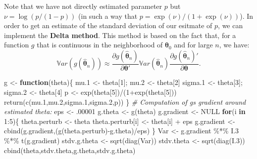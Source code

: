 \documentclass[
  12pt,
]{book}
\newenvironment{Shaded}{\begin{snugshade}}{\end{snugshade}}
\newcommand{\CommentTok}[1]{\textcolor[rgb]{0.56,0.35,0.01}{\textit{#1}}}
\newcommand{\ConstantTok}[1]{\textcolor[rgb]{0.00,0.00,0.00}{#1}}
\newcommand{\ControlFlowTok}[1]{\textcolor[rgb]{0.13,0.29,0.53}{\textbf{#1}}}
\newcommand{\DecValTok}[1]{\textcolor[rgb]{0.00,0.00,0.81}{#1}}
\newcommand{\FloatTok}[1]{\textcolor[rgb]{0.00,0.00,0.81}{#1}}
\newcommand{\FunctionTok}[1]{\textcolor[rgb]{0.00,0.00,0.00}{#1}}
\newcommand{\NormalTok}[1]{#1}
\newcommand{\OtherTok}[1]{\textcolor[rgb]{0.56,0.35,0.01}{#1}}
\newcommand{\SpecialCharTok}[1]{\textcolor[rgb]{0.00,0.00,0.00}{#1}}
\theoremstyle{definition}
\theoremstyle{definition}
\theoremstyle{definition}
\theoremstyle{definition}
\theoremstyle{remark}
\begin{document}
Note that we have not directly estimated parameter \(p\) but \(\nu = \log(p/(1-p))\) (in such a way that \(p = \exp(\nu)/(1+\exp(\nu))\)). In order to get an estimate of the standard deviation of our esitmate of \(p\), we can implement the \textbf{Delta method}. This method is based on the fact that, for a function \(g\) that is continuous in the neighborhood of \(\boldsymbol\theta_0\) and for large \(n\), we have:
\begin{equation}
\mathbb{V}ar(g(\hat{\boldsymbol\theta}_n)) \approx \frac{\partial g(\hat{\boldsymbol\theta}_n)}{\partial \boldsymbol\theta'}\mathbb{V}ar(\hat{\boldsymbol\theta}_n)\frac{\partial g(\hat{\boldsymbol\theta}_n)'}{\partial \boldsymbol\theta}.\label{eq:DeltaMethod}
\end{equation}

\begin{Shaded}
\begin{Highlighting}[]
\NormalTok{g }\OtherTok{\textless{}{-}} \ControlFlowTok{function}\NormalTok{(theta)\{}
\NormalTok{  mu}\FloatTok{.1} \OtherTok{\textless{}{-}}\NormalTok{ theta[}\DecValTok{1}\NormalTok{]; mu}\FloatTok{.2} \OtherTok{\textless{}{-}}\NormalTok{ theta[}\DecValTok{2}\NormalTok{]}
\NormalTok{  sigma}\FloatTok{.1} \OtherTok{\textless{}{-}}\NormalTok{ theta[}\DecValTok{3}\NormalTok{]; sigma}\FloatTok{.2} \OtherTok{\textless{}{-}}\NormalTok{ theta[}\DecValTok{4}\NormalTok{]}
\NormalTok{  p }\OtherTok{\textless{}{-}} \FunctionTok{exp}\NormalTok{(theta[}\DecValTok{5}\NormalTok{])}\SpecialCharTok{/}\NormalTok{(}\DecValTok{1}\SpecialCharTok{+}\FunctionTok{exp}\NormalTok{(theta[}\DecValTok{5}\NormalTok{]))}
  \FunctionTok{return}\NormalTok{(}\FunctionTok{c}\NormalTok{(mu}\FloatTok{.1}\NormalTok{,mu}\FloatTok{.2}\NormalTok{,sigma}\FloatTok{.1}\NormalTok{,sigma}\FloatTok{.2}\NormalTok{,p))}
\NormalTok{\}}
\CommentTok{\# Computation of g\textquotesingle{}s gradient around estimated theta:}
\NormalTok{eps }\OtherTok{\textless{}{-}}\NormalTok{ .}\DecValTok{00001}
\NormalTok{g.theta }\OtherTok{\textless{}{-}} \FunctionTok{g}\NormalTok{(theta)}
\NormalTok{g.gradient }\OtherTok{\textless{}{-}} \ConstantTok{NULL}
\ControlFlowTok{for}\NormalTok{(i }\ControlFlowTok{in} \DecValTok{1}\SpecialCharTok{:}\DecValTok{5}\NormalTok{)\{}
\NormalTok{  theta.perturb }\OtherTok{\textless{}{-}}\NormalTok{ theta}
\NormalTok{  theta.perturb[i] }\OtherTok{\textless{}{-}}\NormalTok{ theta[i] }\SpecialCharTok{+}\NormalTok{ eps}
\NormalTok{  g.gradient }\OtherTok{\textless{}{-}} \FunctionTok{cbind}\NormalTok{(g.gradient,(}\FunctionTok{g}\NormalTok{(theta.perturb)}\SpecialCharTok{{-}}\NormalTok{g.theta)}\SpecialCharTok{/}\NormalTok{eps)}
\NormalTok{\}}
\NormalTok{Var }\OtherTok{\textless{}{-}}\NormalTok{ g.gradient }\SpecialCharTok{\%*\%}\NormalTok{ I}\FloatTok{.3} \SpecialCharTok{\%*\%} \FunctionTok{t}\NormalTok{(g.gradient)}
\NormalTok{stdv.g.theta }\OtherTok{\textless{}{-}} \FunctionTok{sqrt}\NormalTok{(}\FunctionTok{diag}\NormalTok{(Var))}
\NormalTok{stdv.theta }\OtherTok{\textless{}{-}} \FunctionTok{sqrt}\NormalTok{(}\FunctionTok{diag}\NormalTok{(I}\FloatTok{.3}\NormalTok{))}
\FunctionTok{cbind}\NormalTok{(theta,stdv.theta,g.theta,stdv.g.theta)}
\end{Highlighting}
\end{Shaded}
\end{document}
